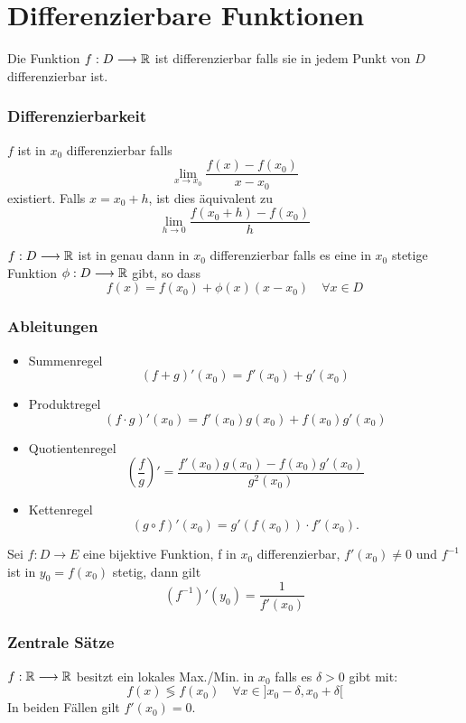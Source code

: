 \part{Differenzierbare Funktionen}
\setcounter{section}{0}
\Def Die Funktion $f: D \longrightarrow \mathbb{R}$ ist differenzierbar falls sie in jedem Punkt von $D$ differenzierbar ist.

\section{Differenzierbarkeit}

\Def $f$ ist in $x_0$ differenzierbar falls 
$$\lim \limits_{x \rightarrow x_{0}} \frac{f(x)-f\left(x_{0}\right)}{x-x_{0}}$$
existiert. Falls $x=x_0+h$, ist dies äquivalent zu
$$\lim \limits_{h \rightarrow 0} \frac{f\left(x_{0}+h\right)-f\left(x_{0}\right)}{h}$$

\Satz $f : D \longrightarrow \mathbb{R}$ ist in genau dann in $x_0$ differenzierbar falls es eine in $x_0$ stetige Funktion $\phi : D \longrightarrow \mathbb{R}$ gibt, so dass
$$f(x) = f(x_0) + \phi(x)(x-x_0) \quad \forall x \in D$$


\section{Ableitungen}
\Satz[Ableitungsregeln]
\begin{itemize}
  \item Summenregel
  \[(f+g)'(x_0) = f'(x_0) + g'(x_0)\]
  \item Produktregel
  \[(f\cdot g)'(x_0) = f'(x_0)g(x_0) + f(x_0)g'(x_0)\]
  \item Quotientenregel
  \[\left(\frac{f}{g}\right)'=
  \frac{f'(x_0)g(x_0) - f(x_0)g'(x_0)}{g^2(x_0)}\]
  \item Kettenregel \[
	(g\circ f)'(x_0) = g'(f(x_0))\cdot f'(x_0).
  \]
\end{itemize}

\Korollar[Inverse] Sei $f : D \longrightarrow E$ eine bijektive Funktion, f in $x_0$ differenzierbar, $f'(x_0) \neq 0$ und $f^{-1}$ ist in $y_0 = f(x_0)$ stetig, dann gilt
$$(f^{-1})'(y_0) = \frac{1}{f'(x_0)}$$

\section{Zentrale Sätze}
\Satz[Extrema] $f : \mathbb{R} \longrightarrow \mathbb{R}$ besitzt ein lokales Max./Min. in $x_0$ falls es $\delta >0$ gibt mit:
		$$f(x) \lessgtr f(x_0) \quad \forall x \in ]x_0-\delta, x_0+\delta[ $$
In beiden Fällen gilt $f'(x_0) = 0$.

